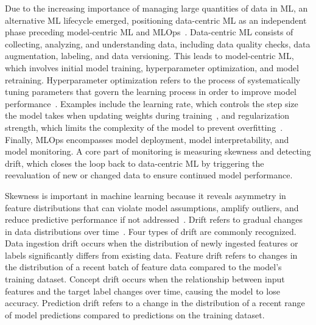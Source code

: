 \documentclass[
english,                 %
bibtex,                  %
includeExtraAbstracts, %
]{kththesis}
\numberwithin{listing}{chapter}
\begin{document}
Due to the increasing importance of managing large quantities of data in \gls{ML}, an alternative \gls{ML} lifecycle emerged, positioning data-centric \gls{ML} as an independent phase preceding model-centric \gls{ML} and \gls{MLOps}~\cite{singh_systematic_2023}. Data-centric \gls{ML} consists of collecting, analyzing, and understanding data, including data quality checks, data augmentation, labeling, and data versioning. This leads to model-centric \gls{ML}, which involves initial model training, hyperparameter optimization, and model retraining. Hyperparameter optimization refers to the process of systematically tuning parameters that govern the learning process in order to improve model performance~\cite{bergstra_random_2012}. Examples include the learning rate, which controls the step size the model takes when updating weights during training~\cite{polyak_methods_1964}, and regularization strength, which limits the complexity of the model to prevent overfitting~\cite{hoerl_ridge_2000}. Finally, \gls{MLOps} encompasses model deployment, model interpretability, and model monitoring. A core part of monitoring is measuring skewness and detecting drift, which closes the loop back to data-centric \gls{ML} by triggering the reevaluation of new or changed data to ensure continued model performance.

Skewness is important in machine learning because it reveals asymmetry in feature distributions that can violate model assumptions, amplify outliers, and reduce predictive performance if not addressed~\cite{hastie_elements_2009}. Drift refers to gradual changes in data distributions over time~\cite{jim_dowling_building_2025}. Four types of drift are commonly recognized. Data ingestion drift occurs when the distribution of newly ingested features or labels significantly differs from existing data. Feature drift refers to changes in the distribution of a recent batch of feature data compared to the model's training dataset. Concept drift occurs when the relationship between input features and the target label changes over time, causing the model to lose accuracy. Prediction drift refers to a change in the distribution of a recent range of model predictions compared to predictions on the training dataset.
\end{document}
